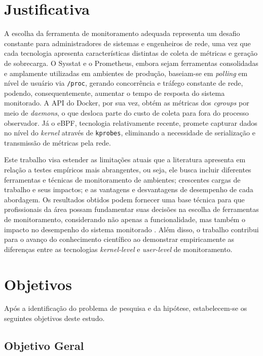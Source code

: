 \section{Justificativa}

A escolha da ferramenta de monitoramento adequada representa um desafio constante para administradores de sistemas e engenheiros de rede, uma vez que cada tecnologia apresenta características distintas de coleta de métricas e geração de sobrecarga. O Sysstat e o Prometheus, embora sejam ferramentas consolidadas e amplamente utilizadas em ambientes de produção, baseiam-se em \textit{polling} em nível de usuário via \texttt{/proc}, gerando concorrência e tráfego constante de rede, podendo, consequentemente, aumentar o tempo de resposta do sistema monitorado. A API do Docker, por sua vez, obtém as métricas dos \textit{cgroups} por meio de \textit{daemons}, o que desloca parte do custo de coleta para fora do processo observador. Já o eBPF, tecnologia relativamente recente, promete capturar dados no nível do \textit{kernel} através de \texttt{kprobes}, eliminando a necessidade de serialização e transmissão de métricas pela rede.

Este trabalho visa estender as limitações atuais que a literatura apresenta \cite{usman_observability_2022} em relação a testes empíricos mais abrangentes, ou seja, ele busca incluir diferentes ferramentas e técnicas de monitoramento de ambientes; crescentes cargas de trabalho e seus impactos; e as vantagens e desvantagens de desempenho de cada abordagem. Os resultados obtidos podem fornecer uma base técnica para que profissionais da área possam fundamentar suas decisões na escolha de ferramentas de monitoramento, considerando não apenas a funcionalidade, mas também o impacto no desempenho do sistema monitorado \cite{10.23919}. Além disso, o trabalho contribui para o avanço do conhecimento científico ao demonstrar empiricamente as diferenças entre as tecnologias \textit{kernel-level} e \textit{user-level} de monitoramento.

\section{Objetivos}

Após a identificação do problema de pesquisa e da hipótese, estabelecem-se os seguintes objetivos deste estudo.

\subsection{Objetivo Geral}

